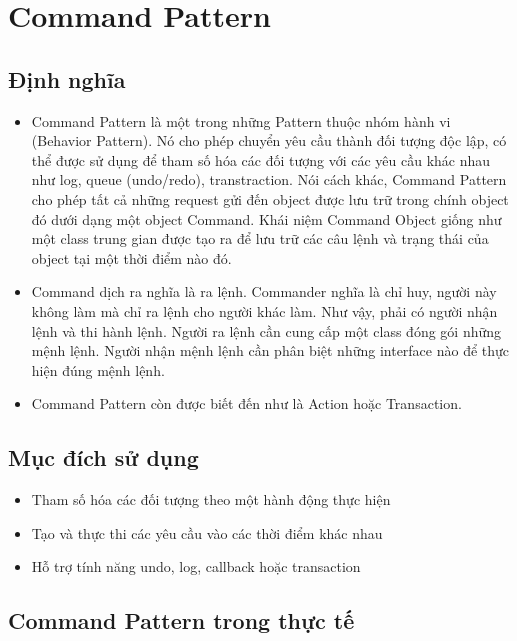 \chapter{Command Pattern}

\section{Định nghĩa}
\begin{itemize}
\item Command Pattern là một trong những Pattern thuộc nhóm hành vi (Behavior Pattern). Nó cho phép chuyển yêu cầu thành đối tượng độc lập, có thể được sử dụng để tham số hóa các đối tượng với các yêu cầu khác nhau như log, queue (undo/redo), transtraction. Nói cách khác, Command Pattern cho phép tất cả những request gửi đến object được lưu trữ trong chính object đó dưới dạng một object Command. Khái niệm Command Object giống như một class trung gian được tạo ra để lưu trữ các câu lệnh và trạng thái của object tại một thời điểm nào đó.
\item Command dịch ra nghĩa là ra lệnh. Commander nghĩa là chỉ huy, người này không làm mà chỉ ra lệnh cho người khác làm. Như vậy, phải có người nhận lệnh và thi hành lệnh. Người ra lệnh cần cung cấp một class đóng gói những mệnh lệnh. Người nhận mệnh lệnh cần phân biệt những interface nào để thực hiện đúng mệnh lệnh.
\item Command Pattern còn được biết đến như là Action hoặc Transaction.
\end{itemize}

\section{Mục đích sử dụng}
\begin{itemize}
\item Tham số hóa các đối tượng theo một hành động thực hiện
\item Tạo và thực thi các yêu cầu vào các thời điểm khác nhau
\item Hỗ trợ tính năng undo, log, callback hoặc transaction
\end{itemize}

\section{Command Pattern trong thực tế}

